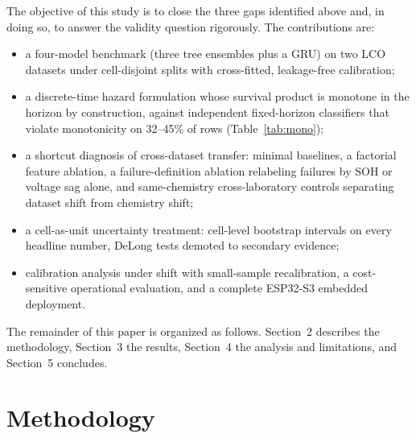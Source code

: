 \documentclass[preprint,12pt]{elsarticle}
\begin{document}
The objective of this study is to close the three gaps identified above and, in doing so, to answer the validity question rigorously. The contributions are:
\begin{itemize}
\item a four-model benchmark (three tree ensembles plus a GRU) on two LCO datasets under cell-disjoint splits with cross-fitted, leakage-free calibration;
\item a discrete-time hazard formulation whose survival product is monotone in the horizon by construction, against independent fixed-horizon classifiers that violate monotonicity on 32--45\% of rows (Table~\ref{tab:mono});
\item a shortcut diagnosis of cross-dataset transfer: minimal baselines, a factorial feature ablation, a failure-definition ablation relabeling failures by SOH or voltage sag alone, and same-chemistry cross-laboratory controls separating dataset shift from chemistry shift;
\item a cell-as-unit uncertainty treatment: cell-level bootstrap intervals on every headline number, DeLong tests demoted to secondary evidence;
\item calibration analysis under shift with small-sample recalibration, a cost-sensitive operational evaluation, and a complete ESP32-S3 embedded deployment.
\end{itemize}

The remainder of this paper is organized as follows. Section~2 describes the methodology, Section~3 the results, Section~4 the analysis and limitations, and Section~5 concludes.

\section{Methodology}
\end{document}
